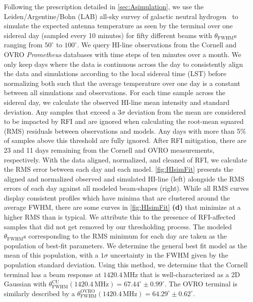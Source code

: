 Following the prescription detailed in \autoref{sec:Asimulation}, we use the Leiden/Argentine/Bohn (LAB) all-sky survey of galactic neutral hydrogen~\cite{kalberlaLeidenArgentineBonn2005} to simulate the expected antenna temperature as seen by the terminal over one sidereal day (sampled every 10 minutes) for fifty different beams with $\theta_\text{FWHM}$s ranging from $50^\circ$ to $100^\circ$. 
We query HI-line observations from the Cornell and OVRO \textit{Prometheus} databases with time steps of ten minutes over a month. 
We only keep days where the data is continuous across the day to consistently align the data and simulations according to the local sidereal time (LST) before normalizing both such that the average temperature over one day is a constant between all simulations and observations. 
For each time sample across the sidereal day, we calculate the observed HI-line mean intensity and standard deviation. 
Any samples that exceed a $3\sigma$ deviation from the mean are considered to be impacted by RFI and are ignored when calculating the root-mean squared (RMS) residuals between observations and models. 
Any days with more than 5\% of samples above this threshold are fully ignored. 
After RFI mitigation, there are 23 and 11 days remaining from the Cornell and OVRO measurements, respectively. 
With the data aligned, normalized, and cleaned of RFI, we calculate the RMS error between each day and each model. 
\autoref{fig:HIsimFit} presents the aligned and normalized observed and simulated HI-line (left) alongside the RMS errors of each day against all modeled beam-shapes (right).
While all RMS curves display consistent profiles which have minima that are clustered around the average FWHM, there are some curves in \autoref{fig:HIsimFit} \textbf{(d)} that minimize at a higher RMS than is typical. 
We attribute this to the presence of RFI-affected samples that did not get removed by our thresholding process.
The modeled $\theta_\text{FWHM}$s corresponding to the RMS minimum for each day are taken as the population of best-fit parameters. 
We determine the general best fit model as the mean of this population, with a $1\sigma$ uncertainty in the FWHM given by the population standard deviation. 
Using this method, we determine that the Cornell terminal has a beam response at $1420.4\,\text{MHz}$ that is well-characterized as a 2D Gaussian with $\theta_\text{FWHM}^\text{CU}(1420.4\,\text{MHz})=67.44^\circ\pm0.99^\circ$. 
The OVRO terminal is similarly described by a $\theta_\text{FWHM}^\text{OVRO}(1420.4\,\text{MHz})=64.29^\circ\pm0.62^\circ$. 

